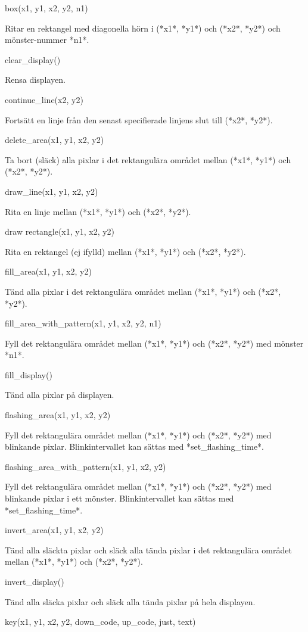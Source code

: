 box(x1, y1, x2, y2, n1)

Ritar en rektangel med diagonella hörn i (*x1*, *y1*) och (*x2*, *y2*)
och mönster-nummer *n1*.

clear\_display()

Rensa displayen.

continue\_line(x2, y2)

Fortsätt en linje från den senast specifierade linjens slut till (*x2*,
*y2*).

delete\_area(x1, y1, x2, y2)

Ta bort (släck) alla pixlar i det rektangulära området mellan (*x1*,
*y1*) och (*x2*, *y2*).

draw\_line(x1, y1, x2, y2)

Rita en linje mellan (*x1*, *y1*) och (*x2*, *y2*).

draw rectangle(x1, y1, x2, y2)

Rita en rektangel (ej ifylld) mellan (*x1*, *y1*) och (*x2*, *y2*).

fill\_area(x1, y1, x2, y2)

Tänd alla pixlar i det rektangulära området mellan (*x1*, *y1*) och
(*x2*, *y2*).

fill\_area\_with\_pattern(x1, y1, x2, y2, n1)

Fyll det rektangulära området mellan (*x1*, *y1*) och (*x2*, *y2*) med
mönster *n1*.

fill\_display()

Tänd alla pixlar på displayen.

flashing\_area(x1, y1, x2, y2)

Fyll det rektangulära området mellan (*x1*, *y1*) och (*x2*, *y2*) med
blinkande pixlar. Blinkintervallet kan sättas med *set\_flashing\_time*.

flashing\_area\_with\_pattern(x1, y1, x2, y2)

Fyll det rektangulära området mellan (*x1*, *y1*) och (*x2*, *y2*) med
blinkande pixlar i ett mönster. Blinkintervallet kan sättas med
*set\_flashing\_time*.

invert\_area(x1, y1, x2, y2)

Tänd alla släckta pixlar och släck alla tända pixlar i det rektangulära
området mellan (*x1*, *y1*) och (*x2*, *y2*).

invert\_display()

Tänd alla släcka pixlar och släck alla tända pixlar på hela displayen.

key(x1, y1, x2, y2, down\_code, up\_code, just, text)

